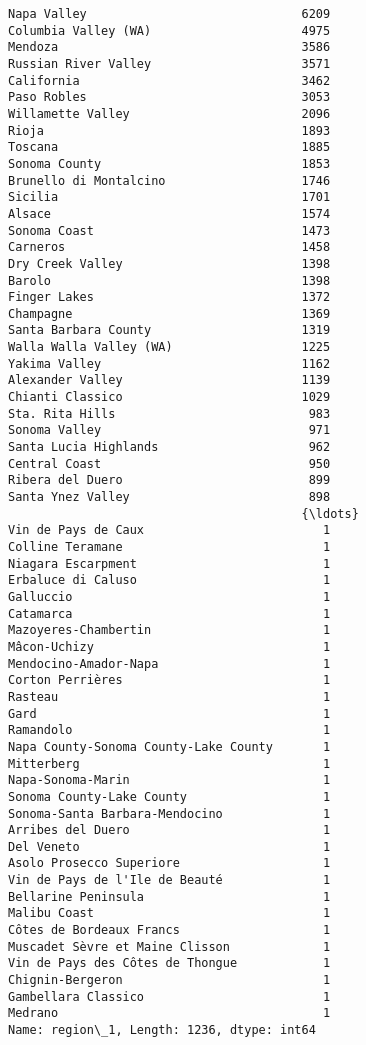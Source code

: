 \documentclass[11pt]{article}
\begin{document}
    \begin{Verbatim}[commandchars=\\\{\}]
Napa Valley                              6209
Columbia Valley (WA)                     4975
Mendoza                                  3586
Russian River Valley                     3571
California                               3462
Paso Robles                              3053
Willamette Valley                        2096
Rioja                                    1893
Toscana                                  1885
Sonoma County                            1853
Brunello di Montalcino                   1746
Sicilia                                  1701
Alsace                                   1574
Sonoma Coast                             1473
Carneros                                 1458
Dry Creek Valley                         1398
Barolo                                   1398
Finger Lakes                             1372
Champagne                                1369
Santa Barbara County                     1319
Walla Walla Valley (WA)                  1225
Yakima Valley                            1162
Alexander Valley                         1139
Chianti Classico                         1029
Sta. Rita Hills                           983
Sonoma Valley                             971
Santa Lucia Highlands                     962
Central Coast                             950
Ribera del Duero                          899
Santa Ynez Valley                         898
                                         {\ldots} 
Vin de Pays de Caux                         1
Colline Teramane                            1
Niagara Escarpment                          1
Erbaluce di Caluso                          1
Galluccio                                   1
Catamarca                                   1
Mazoyeres-Chambertin                        1
Mâcon-Uchizy                                1
Mendocino-Amador-Napa                       1
Corton Perrières                            1
Rasteau                                     1
Gard                                        1
Ramandolo                                   1
Napa County-Sonoma County-Lake County       1
Mitterberg                                  1
Napa-Sonoma-Marin                           1
Sonoma County-Lake County                   1
Sonoma-Santa Barbara-Mendocino              1
Arribes del Duero                           1
Del Veneto                                  1
Asolo Prosecco Superiore                    1
Vin de Pays de l'Ile de Beauté              1
Bellarine Peninsula                         1
Malibu Coast                                1
Côtes de Bordeaux Francs                    1
Muscadet Sèvre et Maine Clisson             1
Vin de Pays des Côtes de Thongue            1
Chignin-Bergeron                            1
Gambellara Classico                         1
Medrano                                     1
Name: region\_1, Length: 1236, dtype: int64

    \end{Verbatim}
\end{document}
